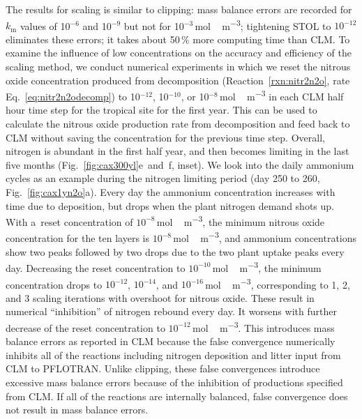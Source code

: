 \documentclass[gmdd, online, hvmath]{copernicus}
\begin{document}
      The results for scaling is similar to clipping: mass balance errors
      are recorded for $k_\mathrm{m}$ values of 10$^{-6}$ and 10$^{-9}$ but
      not for 10$^{-3}$\,\unit{mol\,m^{-3}}; tightening STOL to $10^{-12}$
      eliminates these errors; it takes about 50\,{\%} more computing time
      than CLM. To examine the influence of low concentrations on the
      accuracy and efficiency of the scaling method, we conduct numerical
      experiments in which we reset the nitrous oxide concentration produced
      from decomposition (Reaction~\ref{rxn:nitr2n2o}, rate
      Eq.~\ref{eq:nitr2n2odecomp}) to 10$^{-12}$, 10$^{-10}$, or
      10$^{-8}$\,\unit{mol\,m^{-3}} in each CLM half hour time step for the
      tropical site for the first year. This can be used to calculate the
      nitrous oxide production rate from decomposition and feed back to CLM
      without saving the concentration for the previous time step. Overall,
      nitrogen is abundant in the first half year, and then becomes limiting
      in the last five months (Fig.~\ref{fig:cax300yl}e~and~f, inset). We
      look into the daily ammonium cycles as an example during the nitrogen
      limiting period (day 250 to 260, Fig.~\ref{fig:cax1yn2o}a). Every day
      the ammonium concentration increases with time due to deposition, but
      drops when the plant nitrogen demand shots up. With a~reset
      concentration of $10^{-8}$\,\unit{mol\,m^{-3}}, the minimum nitrous
      oxide concentration for the ten layers is
      $10^{-8}$\,\unit{mol\,m^{-3}}, and ammonium concentrations show two
      peaks followed by two drops due to the two plant uptake peaks every
      day. Decreasing the reset concentration to
      $10^{-10}$\,\unit{mol\,m^{-3}}, the minimum concentration drops to
      $10^{-12}$, $10^{-14}$, and $10^{-16}$\,\unit{mol\,m^{-3}},
      corresponding to 1, 2, and 3 scaling iterations with overshoot for
      nitrous oxide. These result in numerical ``inhibition'' of nitrogen
      rebound every day. It worsens with further decrease of the reset
      concentration to $10^{-12}$\,\unit{mol\,m^{-3}}. This introduces mass
      balance errors as reported in CLM because the false convergence
      numerically inhibits all of the reactions including nitrogen
      deposition and litter input from CLM to PFLOTRAN.  Unlike clipping,
      these false convergences introduce excessive mass balance errors
      because of the inhibition of productions specified from CLM. If all of
      the reactions are internally balanced, false convergence does not
      result in mass balance errors.
\end{document}
